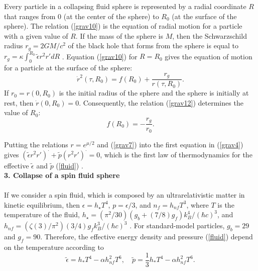 \documentclass[prd,onecolumn,nofootinbib]{revtex4}
\begin{document}
Every particle in a collapsing fluid sphere is represented by a radial coordinate $R$ that ranges from 0 (at the center of the sphere) to $R_0$ (at the surface of the sphere).
The relation (\ref{grav10}) is the equation of radial motion for a particle with a given value of $R$.
If the mass of the sphere is $M$, then the Schwarzschild radius $r_g=2GM/c^2$ of the black hole that forms from the sphere is equal to $r_g=\kappa\int_0^{R_0}\tilde{\epsilon}r^2 r'dR$ \cite{LL2}.
Equation (\ref{grav10}) for $R=R_0$ gives the equation of motion for a particle at the surface of the sphere:
\begin{equation}
    \dot{r}^2(\tau,R_0)=f(R_0)+\frac{r_g}{r(\tau,R_0)}.
    \label{grav12}
\end{equation}
If $r_0=r(0,R_0)$ is the initial radius of the sphere and the sphere is initially at rest, then $\dot{r}(0,R_0)=0$.
Consequently, the relation (\ref{grav12}) determines the value of $R_0$:
\begin{equation}
    f(R_0)=-\frac{r_g}{r_0}.
    \label{grav13}
\end{equation}

Putting the relations $r=e^{\mu/2}$ and (\ref{grav7}) into the first equation in (\ref{grav4}) gives $(\tilde{\epsilon}r^2 r')^\cdot+\tilde{p}(r^2 r')^\cdot=0$, which is the first law of thermodynamics for the effective $\tilde{\epsilon}$ and $\tilde{p}$ (\ref{fluid}) \cite{ApJ}.\\


{\bf 3. Collapse of a spin fluid sphere}\\ \\
If we consider a spin fluid, which is composed by an ultrarelativistic matter in kinetic equilibrium, then $\epsilon=h_\star T^4$, $p=\epsilon/3$, and $n_f=h_{nf}T^3$, where $T$ is the temperature of the fluid, $h_\star=(\pi^2/30)(g_b+(7/8)g_f)k_B^4/(\hbar c)^3$, and $h_{nf}=(\zeta(3)/\pi^2)(3/4)g_f k_B^3/(\hbar c)^3$ \cite{ApJ,Gabe}.
For standard-model particles, $g_b=29$ and $g_f=90$.
Therefore, the effective energy density and pressure (\ref{fluid}) depend on the temperature according to
\[
    \tilde{\epsilon}=h_\ast T^4-\alpha h_{nf}^2 T^6,\quad \tilde{p}=\frac{1}{3}h_\ast T^4-\alpha h_{nf}^2 T^6.
\]
\end{document}
